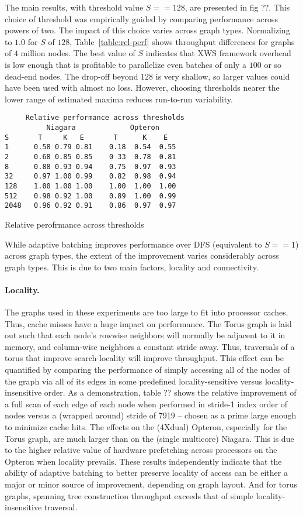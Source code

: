 The main results, with threshold value $S==128$, are presented in 
fig ??.  This choice of threshold was empirically guided by comparing
performance across powers of two. The impact of this choice varies
across graph types. Normalizing to $1.0$ for $S$ of $128$,
Table~\ref{table:rel-perf} shows throughput differences for graphs of
$4$ million nodes.  The best value of $S$ indicates that XWS framework
overhead is low enough that is profitable to parallelize even batches
of only a $100$ or so dead-end nodes. The drop-off beyond $128$ is
very shallow, so larger values could have been used with almost no
loss.  However, choosing thresholds nearer the lower range of
estimated maxima reduces run-to-run variability.

\begin{table}
{\footnotesize
\begin{verbatim}
     Relative performance across thresholds
          Niagara             Opteron
S       T     K   E       T      K    E
1      0.58 0.79 0.81    0.18  0.54  0.55
2      0.68 0.85 0.85    0 33  0.78  0.81
8      0.88 0.93 0.94    0.75  0.97  0.93
32     0.97 1.00 0.99    0.82  0.98  0.94
128    1.00 1.00 1.00    1.00  1.00  1.00
512    0.98 0.92 1.00    0.89  1.00  0.99
2048   0.96 0.92 0.91    0.86  0.97  0.97
\end{verbatim}}
\caption{Relative perofrmance across thresholds}\label{table:rel-perf}
\end{table}
While adaptive batching improves performance over DFS (equivalent to
$S==1$) across graph types, the extent of the improvement varies
considerably across graph types. This is due to two main factors,
locality and connectivity.

\paragraph{Locality.} The graphs used in these experiments are too large to fit
into processor caches. Thus, cache misses have a huge impact on
performance. The Torus graph is laid out such that each node's rowwise
neighbors will normally be adjacent to it in memory, and column-wise
neighbors a constant stride away. Thus, traversals of a torus that
improve search locality will improve throughput.  This effect can be
quantified by comparing the performance of simply accessing all of the
nodes of the graph via all of its edges in some predefined
locality-sensitive versus locality-insensitive order.  As a
demonstration, table ?? shows the relative improvement of a full scan
of each edge of each node when performed in stride-1 index order of
nodes versus a (wrapped around) stride of 7919 -- chosen as a prime
large enough to minimize cache hits.  The effects on the (4Xdual)
Opteron, especially for the Torus graph, are much larger than on the
(single multicore) Niagara. This is due to the higher relative value
of hardware prefetching across processors on the Opteron when locality
prevails.  These results independently indicate that the ability of
adaptive batching to better preserve locality of access can be either
a major or minor source of improvement, depending on graph layout.
And for torus graphs, spanning tree construction throughput exceeds
that of simple locality-insensitive traversal.

